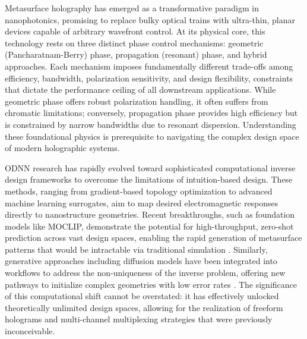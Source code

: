 \documentclass[11pt]{article}
\begin{document}
Metasurface holography has emerged as a transformative paradigm in nanophotonics, promising to replace bulky optical trains with ultra-thin, planar devices capable of arbitrary wavefront control. At its physical core, this technology rests on three distinct phase control mechanisms: geometric (Pancharatnam-Berry) phase, propagation (resonant) phase, and hybrid approaches. Each mechanism imposes fundamentally different trade-offs among efficiency, bandwidth, polarization sensitivity, and design flexibility, constraints that dictate the performance ceiling of all downstream applications. While geometric phase offers robust polarization handling, it often suffers from chromatic limitations; conversely, propagation phase provides high efficiency but is constrained by narrow bandwidths due to resonant dispersion. Understanding these foundational physics is prerequisite to navigating the complex design space of modern holographic systems.

ODNN research has rapidly evolved toward sophisticated computational inverse design frameworks to overcome the limitations of intuition-based design. These methods, ranging from gradient-based topology optimization \citep{doi_10_2528_pier12020501_bb5007b1} to advanced machine learning surrogates, aim to map desired electromagnetic responses directly to nanostructure geometries. Recent breakthroughs, such as foundation models like MOCLIP, demonstrate the potential for high-throughput, zero-shot prediction across vast design spaces, enabling the rapid generation of metasurface patterns that would be intractable via traditional simulation \citep{doi_10_1038_s41467_026_76714_x_8ca5d39b}. Similarly, generative approaches including diffusion models have been integrated into workflows to address the non-uniqueness of the inverse problem, offering new pathways to initialize complex geometries with low error rates \citep{doi_10_48550_arxiv_2506_21748_dc49c062}. The significance of this computational shift cannot be overstated: it has effectively unlocked theoretically unlimited design spaces, allowing for the realization of freeform holograms and multi-channel multiplexing strategies that were previously inconceivable.
\end{document}

